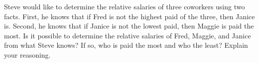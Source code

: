 \documentclass[a4paper,12pt,oneside,article]{memoir}
\begin{document}

\clearpage


\begin{tcolorbox}
	[colback=Emerald!10,colframe=cyan!40!black,title=\textbf{Question 37}]
	Steve would like to determine the relative salaries of three
	coworkers using two facts. First, he knows that if Fred
	is not the highest paid of the three, then Janice is. Second, he knows that if Janice is not the lowest paid, then
	Maggie is paid the most. Is it possible to determine the
	relative salaries of Fred, Maggie, and Janice from what
	Steve knows? If so, who is paid the most and who the
	least? Explain your reasoning.

\end{tcolorbox}
\end{document}
